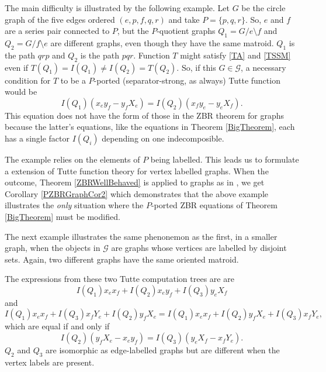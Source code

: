 \documentclass[12pt,leqno]{amsart}
\theoremstyle{remark}
\begin{document}
The main difficulty is illustrated by the following example.
Let
$G$ be the circle graph of the five edges
ordered $(e,p,f,q,r)$ and take $P=\{p,q,r\}$.  
So, $e$ and $f$ are a series pair connected to $P$, but
the $P$-quotient graphs $Q_1=G/e\setminus f$ and 
$Q_2=G/f\setminus e$ are different graphs, even though they have 
the same matroid.  $Q_1$ is the path $qrp$ and $Q_2$ is the path $pqr$.
Function $T$ might satisfy \eqref{TA}
and \eqref{TSSM} even if $T(Q_1)=I(Q_1)\neq I(Q_2)=T(Q_2)$.
So, if this $G\in\mathcal{G}$, a necessary condition 
for $T$ to be a $P$-ported
(separator-strong, as always) Tutte function would be
\begin{equation}
I(Q_1)(x_ey_f - y_fX_e) = I(Q_2)(x_fy_e - y_eX_f).
\end{equation}
This equation does not have the form of 
those in the ZBR theorem for graphs \cite{Ellis-Monaghan-Traldi}
because the latter's equations, like the equations in
Theorem \ref{BigTheorem}, each has a single factor 
$I(Q_i)$ depending on one indecomposible.


The example relies on the elements of $P$ being labelled.
This leads us to formulate a extension of Tutte function theory
for vertex labelled graphs.  
When the outcome, Theorem \ref{ZBRWellBehaved} is applied to graphs as in 
\cite{Ellis-Monaghan-Traldi}, we get Corollary \ref{PZBRGraphCor2}
which demonstrates that the above example illustrates the
\emph{only} situation where the $P$-ported ZBR equations
of Theorem \ref{BigTheorem} must be modified.

The next example illustrates 
the same phenonemon as the first, in a smaller graph, when
the objects in $\mathcal{G}$ are graphs whose vertices are 
labelled by disjoint sets.  Again, two different graphs have the
same oriented matroid.



The expressions from these two Tutte computation trees are
are 
\[
I(Q_1)x_ex_f+I(Q_2)x_ey_f+I(Q_3)y_eX_f
\]
and
\[
I(Q_1)x_ex_f+I(Q_3)x_fY_e+I(Q_2)y_fX_e=
I(Q_1)x_ex_f+I(Q_2)y_fX_e+I(Q_3)x_fY_e,
\]
which are equal if and only if
\begin{equation}
\label{BadZBRExampleEq}
I(Q_2)(y_fX_e - x_ey_f)=
I(Q_3)(y_eX_f - x_fY_e).
\end{equation}
$Q_2$ and $Q_3$ are isomorphic as edge-labelled graphs
but are different when the vertex
labels are present.
\end{document}
